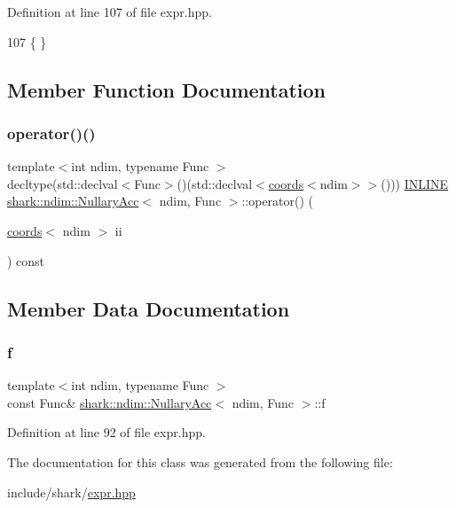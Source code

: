Definition at line 107 of file expr.\+hpp.


\begin{DoxyCode}
107 \{ \}
\end{DoxyCode}


\subsection{Member Function Documentation}
\hypertarget{classshark_1_1ndim_1_1_nullary_acc_a54d80a3d684587e7ca45d780e4832faf}{}\label{classshark_1_1ndim_1_1_nullary_acc_a54d80a3d684587e7ca45d780e4832faf} 
\subsubsection{\texorpdfstring{operator()()}{operator()()}}
{\footnotesize\ttfamily template$<$int ndim, typename Func $>$ \\
decltype(std\+::declval$<$Func$>$()(std\+::declval$<$\hyperlink{structshark_1_1ndim_1_1coords}{coords}$<$ndim$>$$>$())) \hyperlink{common_8hpp_a2eb6f9e0395b47b8d5e3eeae4fe0c116}{I\+N\+L\+I\+NE} \hyperlink{classshark_1_1ndim_1_1_nullary_acc}{shark\+::ndim\+::\+Nullary\+Acc}$<$ ndim, Func $>$\+::operator() (\begin{DoxyParamCaption}\item[{\hyperlink{structshark_1_1ndim_1_1coords}{coords}$<$ ndim $>$}]{ii }\end{DoxyParamCaption}) const}



\subsection{Member Data Documentation}
\hypertarget{classshark_1_1ndim_1_1_nullary_acc_a2818f289b8c710f249e38a20412cf54d}{}\label{classshark_1_1ndim_1_1_nullary_acc_a2818f289b8c710f249e38a20412cf54d} 
\subsubsection{\texorpdfstring{f}{f}}
{\footnotesize\ttfamily template$<$int ndim, typename Func $>$ \\
const Func\& \hyperlink{classshark_1_1ndim_1_1_nullary_acc}{shark\+::ndim\+::\+Nullary\+Acc}$<$ ndim, Func $>$\+::f\hspace{0.3cm}{\ttfamily [private]}}



Definition at line 92 of file expr.\+hpp.



The documentation for this class was generated from the following file\+:\begin{DoxyCompactItemize}
\item 
include/shark/\hyperlink{expr_8hpp}{expr.\+hpp}\end{DoxyCompactItemize}
